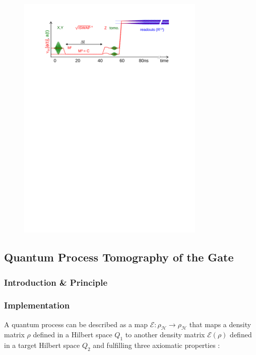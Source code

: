\begin{figure}[ht!]
	\centering
		\includegraphics[width=0.8\textwidth]{./material/papers/iswap/figures/iswap_gate_pulse_sequence}
	\caption{}
	\label{fig:ISwapPulseSequence}
\end{figure}


\subsection{Quantum Process Tomography of the Gate}

\subsubsection{Introduction \& Principle}

\subsubsection{Implementation}

A quantum process can be described as a map $\mathcal{E} : \rho_\mathcal{H} \to \rho_\mathcal{H}$ that maps a density matrix $\rho$ defined in a Hilbert space $Q_1$ to another density matrix $\mathcal{E}(\rho)$ defined in a target Hilbert space $Q_2$ and fulfilling three axiomatic properties \cite{nielsen_quantum_2000,haroche_exploring_2006}:

